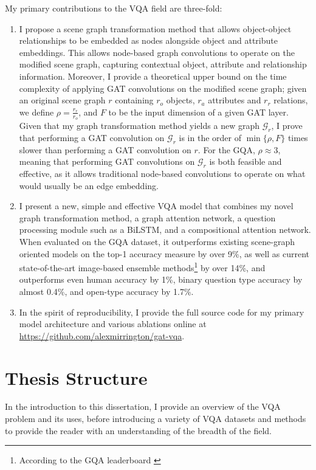 My primary contributions to the VQA field are three-fold:

\begin{enumerate}
    \item I propose a scene graph transformation method that allows object-object relationships to be embedded as nodes alongside object and attribute embeddings. This allows node-based graph convolutions to operate on the modified scene graph, capturing contextual object, attribute and relationship information. Moreover, I provide a theoretical upper bound on the time complexity of applying GAT convolutions on the modified scene graph; given an original scene graph \(r\) containing \(r_o\) objects, \(r_a\) attributes and \(r_r\) relations, we define \(\rho = \frac{r_r}{r_o}\), and \(F\) to be the input dimension of a given GAT layer. Given that my graph transformation method yields a new graph \(\mathcal{G}_r\), I prove that performing a GAT convolution on \(\mathcal{G}_r\) is in the order of \(\min\{\rho, F\}\) times slower than performing a GAT convolution on \(r\). For the GQA, \(\rho \approx 3\), meaning that performing GAT convolutions on \(\mathcal{G}_r\) is both feasible and effective, as it allows traditional node-based convolutions to operate on what would usually be an edge embedding.
    \item I present a new, simple and effective  VQA model that combines my novel graph transformation method, a graph attention network, a question processing module such as a BiLSTM, and a compositional attention network. When evaluated on the GQA dataset, it outperforms existing scene-graph oriented models on the top-1 accuracy measure by over 9\%, as well as current state-of-the-art image-based ensemble methods\footnote{According to the GQA leaderboard \cite{gqachallenge}} by over 14\%, and outperforms even human accuracy by 1\%, binary question type accuracy by almost 0.4\%, and open-type accuracy by 1.7\%.
    \item In the spirit of reproducibility, I provide the full source code for my primary model architecture and various ablations online at \url{https://github.com/alexmirrington/gat-vqa}.
\end{enumerate}

\section{Thesis Structure}

In the introduction to this dissertation, I provide an overview of the VQA problem and its uses, before introducing a variety of VQA datasets and methods to provide the reader with an understanding of the breadth of the field.

